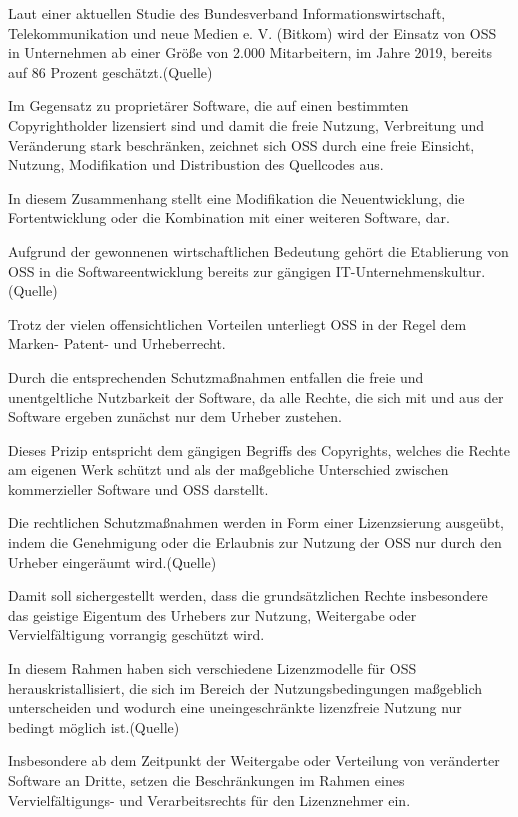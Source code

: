Laut einer aktuellen Studie des Bundesverband Informationswirtschaft, Telekommunikation und neue Medien e. V. (Bitkom) wird der Einsatz von OSS in Unternehmen ab einer Größe von 2.000 Mitarbeitern, im Jahre 2019, bereits auf 86 Prozent geschätzt.(Quelle) 

Im Gegensatz zu proprietärer Software, die auf einen bestimmten Copyrightholder lizensiert sind und damit die freie Nutzung, Verbreitung und Veränderung stark beschränken, zeichnet sich OSS durch eine freie Einsicht, Nutzung, Modifikation und Distribustion des Quellcodes aus.   

In diesem Zusammenhang stellt eine Modifikation die Neuentwicklung, die Fortentwicklung oder die Kombination mit einer weiteren Software, dar. 

Aufgrund der gewonnenen wirtschaftlichen Bedeutung gehört die Etablierung von OSS in die Softwareentwicklung bereits zur gängigen IT-Unternehmenskultur.(Quelle) 

Trotz der vielen offensichtlichen Vorteilen unterliegt OSS in der Regel dem Marken- Patent- und Urheberrecht. 

Durch die entsprechenden Schutzmaßnahmen entfallen die freie und unentgeltliche Nutzbarkeit der Software, da alle Rechte, die sich mit und aus der Software ergeben zunächst nur dem Urheber zustehen.  

Dieses Prizip entspricht dem gängigen Begriffs des Copyrights, welches die Rechte am eigenen Werk schützt und als der maßgebliche Unterschied zwischen kommerzieller Software und OSS darstellt. 

Die rechtlichen Schutzmaßnahmen werden in Form einer Lizenzsierung ausgeübt, indem die Genehmigung oder die Erlaubnis zur Nutzung der OSS nur durch den Urheber eingeräumt wird.(Quelle) 

Damit soll sichergestellt werden, dass die grundsätzlichen Rechte insbesondere das geistige Eigentum des Urhebers zur Nutzung, Weitergabe oder Vervielfältigung vorrangig geschützt wird.

In diesem Rahmen haben sich verschiedene Lizenzmodelle für OSS herauskristallisiert, die sich im Bereich der Nutzungsbedingungen maßgeblich unterscheiden und wodurch eine uneingeschränkte lizenzfreie Nutzung nur bedingt möglich ist.(Quelle) 

Insbesondere ab dem Zeitpunkt der Weitergabe oder Verteilung von veränderter Software an Dritte, setzen die Beschränkungen im Rahmen eines Vervielfältigungs- und Verarbeitsrechts für den Lizenznehmer ein.

